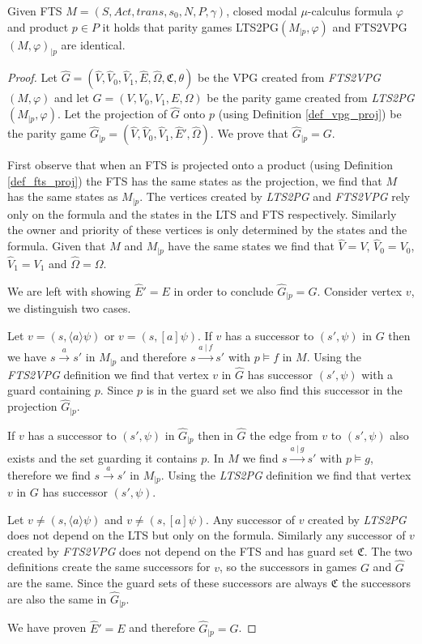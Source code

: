 \begin{lemma}
	\label{lem_VPG_proj_is_FTS_proj}
	Given FTS $M = (S, Act, trans, s_0, N, P, \gamma)$, closed modal $\mu$-calculus formula $\varphi$ and product $p \in P$ it holds that parity games LTS2PG$(M_{|p}, \varphi)$ and FTS2VPG$(M, \varphi)_{|p}$ are identical.
	\begin{proof}
		Let $\hat{G} = (\hat{V},\hat{V}_0,\hat{V}_1,\hat{E},\hat{\Omega},\mathfrak{C},\theta)$ be the VPG created from \textit{FTS2VPG}$(M,\varphi)$ and let $G = (V,V_0,V_1,E,\Omega)$ be the parity game created from \textit{LTS2PG}$(M_{|p},\varphi)$. Let the projection of $\hat{G}$ onto $p$ (using Definition \ref{def_vpg_proj}) be the parity game $\hat{G}_{|p} = (\hat{V},\hat{V}_0,\hat{V}_1,\hat{E}',\hat{\Omega})$. We prove that $\hat{G}_{|p} = G$.
		
		First observe that when an FTS is projected onto a product (using Definition \ref{def_fts_proj}) the FTS has the same states as the projection, we find that $M$ has the same states as $M_{|p}$. The vertices created by \textit{LTS2PG} and \textit{FTS2VPG} rely only on the formula and the states in the LTS and FTS respectively. Similarly the owner and priority of these vertices is only determined by the states and the formula. Given that $M$ and $M_{|p}$ have the same states we find that $\hat{V} = V$, $\hat{V}_0 = V_0$, $\hat{V}_1 = V_1$ and $\hat{\Omega} = \Omega$.
		
		We are left with showing $\hat{E}' = E$ in order to conclude $\hat{G}_{|p} = G$. Consider vertex $v$, we distinguish two cases. 
		
		Let $v = (s,\langle a \rangle \psi)$ or $v = (s,[a] \psi)$. If $v$ has a successor to $(s',\psi)$ in $G$ then we have $s \xrightarrow{a} s'$ in $M_{|p}$ and therefore $s \xrightarrow{a\ |\ f} s'$ with $p \models f$ in $M$. Using the \textit{FTS2VPG} definition we find that vertex $v$ in $\hat{G}$ has successor $(s',\psi)$ with a guard containing $p$. Since $p$ is in the guard set we also find this successor in the projection $\hat{G}_{|p}$. 
		
		If $v$ has a successor to $(s',\psi)$ in $\hat{G}_{|p}$ then in $\hat{G}$ the edge from $v$ to $(s',\psi)$ also exists and the set guarding it contains $p$. In $M$ we find $s \xrightarrow{a\ |\ g} s'$ with $p \models g$, therefore we find $s \xrightarrow{a} s'$ in $M_{|p}$. Using the \textit{LTS2PG} definition we find that vertex $v$ in $G$ has successor $(s',\psi)$.
		
		Let $v \neq (s,\langle a \rangle \psi)$ and $v \neq (s,[a]\psi)$. Any successor of $v$ created by \textit{LTS2PG} does not depend on the LTS but only on the formula. Similarly any successor of $v$ created by \textit{FTS2VPG} does not depend on the FTS and has guard set $\mathfrak{C}$. The two definitions create the same successors for $v$, so the successors in games $G$ and $\hat{G}$ are the same. Since the guard sets of these successors are always $\mathfrak{C}$ the successors are also the same in $\hat{G}_{|p}$.
		
		We have proven $\hat{E}' = E$ and therefore $\hat{G}_{|p} = G$.
	\end{proof}
\end{lemma}
